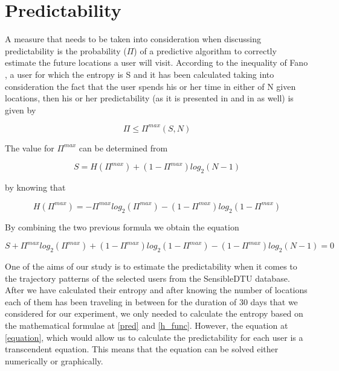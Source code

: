 \section{Predictability}

A measure that needs to be taken into consideration when discussing
predictability is the probability ($\Pi$) of a predictive algorithm to correctly
estimate the future locations a user will visit. According to the inequality of
Fano \cite{brabazon2008natural} \cite{1057678}, a user for which the entropy is
S and it has been calculated taking into consideration the fact that the user
spends his or her time in either of N given locations, then his or her
predictability (as it is presented in \cite{Barabasi10} and in \cite{Sinatra14}
as well) is given by

\begin{equation}
\label{ineq_pred}
\Pi \leq \Pi^{max}(S,N)
\end{equation}

The value for $\Pi^{max}$ can be determined from

\begin{equation}
\label{pred}
S = H(\Pi^{max}) + (1 - \Pi^{max})log_{2}(N-1)  
\end{equation}

by knowing that

\begin{equation}
\label{h_func}
H(\Pi^{max}) = - \Pi^{max}log_{2}(\Pi^{max}) - (1-\Pi^{max})log_{2}(1-\Pi^{max})   
\end{equation}  

By combining the two previous formula we obtain the equation

\begin{equation}
\label{equation}
S + \Pi^{max}log_{2}(\Pi^{max}) + (1-\Pi^{max})log_{2}(1-\Pi^{max}) - (1 -
\Pi^{max})log_{2}(N-1) = 0
\end{equation}

One of the aims of our study is to estimate the predictability when it comes to
the trajectory patterns of the selected users from the SensibleDTU database.
After we have calculated their entropy and after knowing the number of locations
each of them has been traveling in between for the duration of $30$ days that we
considered for our experiment, we only needed to calculate the entropy based on
the mathematical formulae at \ref{pred} and \ref{h_func}. However, the equation
at \ref{equation}, which would allow us to calculate the predictability for each
user is a transcendent equation. This means that the equation can be solved
either numerically or graphically.


